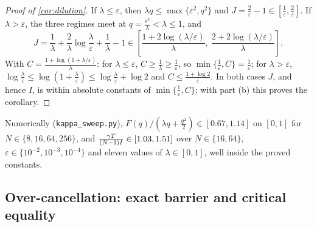 \begin{proof}[Proof of \cref{cor:dilution}]
If $\lambda\le\varepsilon$, then $\lambda q\le\max\{\varepsilon^2,q^2\}$ and $J=\tfrac{2}{\varepsilon}-1\in[\tfrac{1}{\varepsilon},\tfrac{2}{\varepsilon}]$.
If $\lambda>\varepsilon$, the three regimes meet at $q=\tfrac{\varepsilon^2}{\lambda}<\lambda\le1$, and
\[
 J=\frac{1}{\lambda}+\frac{2}{\lambda}\log\frac{\lambda}{\varepsilon}+\frac{1}{\lambda}-1
 \in\left[\frac{1+2\log(\lambda/\varepsilon)}{\lambda},\ \frac{2+2\log(\lambda/\varepsilon)}{\lambda}\right].
\]
With $C=\tfrac{1+\log(1+\lambda/\varepsilon)}{\lambda}$: for $\lambda\le\varepsilon$, $C\ge\tfrac{1}{\lambda}\ge\tfrac{1}{\varepsilon}$, so $\min\{\tfrac{1}{\varepsilon},C\}=\tfrac{1}{\varepsilon}$;
for $\lambda>\varepsilon$, $\log\tfrac{\lambda}{\varepsilon}\le\log(1+\tfrac{\lambda}{\varepsilon})\le\log\tfrac{\lambda}{\varepsilon}+\log2$ and $C\le\tfrac{1+\log2}{\varepsilon}$.
In both cases $J$, and hence $I$, is within absolute constants of $\min\{\tfrac{1}{\varepsilon},C\}$; with part (b) this proves the corollary.
\end{proof}
Numerically (\texttt{kappa\_sweep.py}), $F(q)/(\lambda q+\tfrac{q^2}{2})\in[0.67,1.14]$ on $[0,1]$ for $N\in\{8,16,64,256\}$, and
$\tfrac{\gamma T}{(N-1)I}\in[1.03,1.51]$ over $N\in\{16,64\}$, $\varepsilon\in\{10^{-2},10^{-3},10^{-4}\}$ and eleven values of $\lambda\in[0,1]$, well inside the proved constants.

\subsection{Over-cancellation: exact barrier and critical equality}
\label{app:critical}


